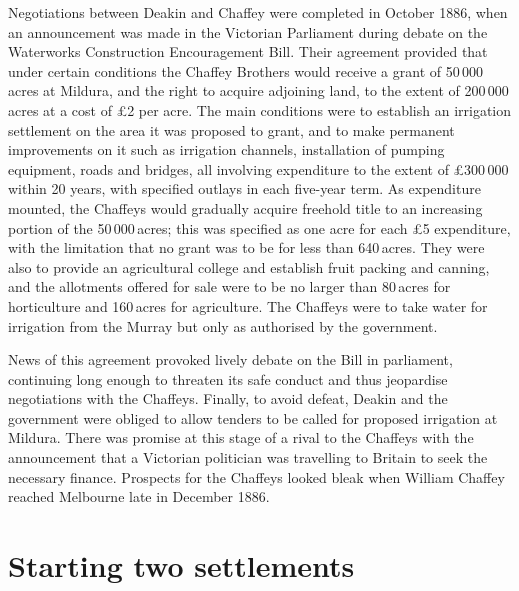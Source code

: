 Negotiations between Deakin and Chaffey were completed in October
1886, when an announcement was made in the Victorian Parliament during
debate on the Waterworks Construction Encouragement Bill.  Their
agreement provided that under certain conditions the Chaffey Brothers
would receive a grant of 50\,000\,acres at Mildura, and the right to
acquire adjoining land, to the extent of 200\,000\,acres at a cost of
\pounds2 per acre.  The main conditions were to establish an irrigation
settlement on the area it was proposed to grant, and to make permanent
improvements on it such as irrigation
channels, installation of pumping
equipment, roads and bridges, all involving expenditure to the extent
of \pounds300\,000 within 20 years, with specified outlays in each
five-year term.  As expenditure mounted, the Chaffeys would gradually
acquire freehold title to an increasing portion of the 50\,000\,acres;
this was specified as one acre for each \pounds5 expenditure, with the
limitation that no grant was to be for less than 640\,acres.  They
were also to provide an agricultural college and establish
fruit packing and canning, and the allotments offered for
sale were to be no larger than 80\,acres for horticulture and
160\,acres for agriculture. The Chaffeys were to take water for
irrigation from the Murray but only as authorised by the
government.

News of this agreement provoked lively debate on the Bill in
parliament, continuing long enough to threaten its safe conduct and
thus jeopardise negotiations with the Chaffeys.  Finally, to avoid
defeat, Dea\-kin and the government were obliged to allow tenders to
be called for proposed irrigation at Mildura.  There was promise at
this stage of a rival to the Chaffeys with the announcement that a
Victorian politician was travelling to Britain to seek
the necessary finance.  Prospects for the Chaffeys
looked bleak when William Chaffey reached Melbourne late in December
1886.

\section*{Starting two settlements}

